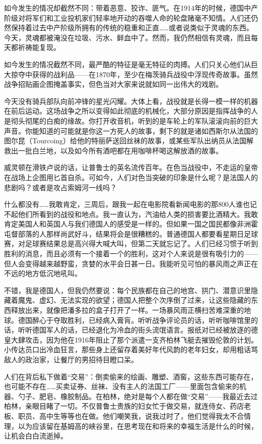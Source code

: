 \documentclass[UTF8]{ctexart}
\begin{document}
如今发生的情况却截然不同：带着恶意、狡诈、匪气。在1914年的时候，德国中产阶级对将军们和工业投机家们轻率地开动的吞噬人命的轮盘赌毫不知情。人们还仍然保持着过去中产阶级所拥有的传统的稳重和正直……或者说类似于灵魂的东西。今天，灵魂都被淹没在垃圾、污水、鲜血中了。然而，我仍然相信有灵魂，而且每天都祈祷能复现。

如今发生的情况截然不同，最严酷的特征是毫无特征的肉搏。人们只关心他们从巨大掠夺中获得的战利品——在1870年，至少在梅茨骑兵战役中浮现传奇故事。虽然战争招贴画企图掩盖事实，但色当对大家来说就如同一出伟大的戏剧。

今天没有骑兵部队向前冲锋的星光闪耀。大体上看，战役就是长得一模一样的机器在前后运动。这场战争之所以变得如此彻底的机械化，大部分原因是指挥战争的人是彻头彻尾的白痴的缘故。你打开收音机，听到的是车轮上的军队滚滚向前的巨大声音。你能知道的可能就是你这一方死人的故事，剩下的就是诸如西斯尔从法国的图尔昆（Tourcoing）给他的特丽萨送回丝袜的故事，或某些军队出纳员从法国解救出一批白兰地，以及如今所有酒吧都在用咖啡杯喝这解放酒的故事。

威灵顿在滑铁卢说的话，让普鲁士的英名流传百年。在色当战役中，不走运的皇帝在战场上企图用匕首自杀。可如今，人们对色当突破的印象是什么呢？是法国人的悲剧吗？或者是攻占索姆河一线吗？

什么都没有……我敢肯定，三周后，跟我一起在电影院看新闻电影的那800人谁也记不起他们所看到的战役和地点。我一直认为，汽油给人类的损害要比酒精大。我敢肯定美国人和英国人与我们德国人的感受是一样的。但如果一国之国民都像非洲霍屯督部落的人那样尚武好斗，结果将会是很糟糕的。普通德国人都要看星期日足球赛，对足球赛结果总是高兴得大喊大叫，但第二天就忘记了。人们已经习惯于听到胜利的消息，而且必须有一个接着一个的胜利，这对个人来说是很有吸引力的——但人会变得越来越野蛮，贪婪的水平会日甚一日。我能听见可怕的暴风雨之声正在不远的地方低沉地吼叫。

不错，我是德国人，但我仍然要说：每个民族都在自己的地宫、拱门、潜意识里隐藏着魔鬼、虚幻、无法实现的欲望；德国人把整个次序倒了过来，让这些隐藏的东西释放出来，就像把潘多拉的盒子打开了一样。一场暴风雨正横扫苦难深重的地球。德国醉心于夺取胜利，已经病入膏肓。听听战争评论员的话，听听咖啡馆里的话，听听德国军人的话，已经退化为冷血的街头流氓语言。报纸对已经被放逐的德皇大肆攻击，因为他在1916年阻止了那个派遣一支齐柏林飞艇去摧毁伦敦的计划。小传达员口出冷血狂言，那些身上还留存着美好年代风韵的老年妇女，却用粗话骂敌人的政治家，让餐厅的男招待目瞪口呆。

人们在背后私下做着“交易”：倒卖偷来的绘画、雕塑、酒窖，这些东西可能存在，也可能不存在……买卖证券、丝袜、没有主人的法国工厂——里面包含偷来的机器、勺子、肥皂、橡胶制品。在柏林，绝对是每个人都在做“交易”——我最近去过柏林，亲眼目睹了一切。不仅普鲁士贵族的妇女忙于做交易，就连侍女、药店老板、职员、高中生等等也在做。他们嘲笑我，说我过时了，他们觉得我太不合情理，以为应该留在基姆高的峡谷里，在思考现在和将来的幸福生活是什么的时候，让机会白白流逝掉。
\end{document}
